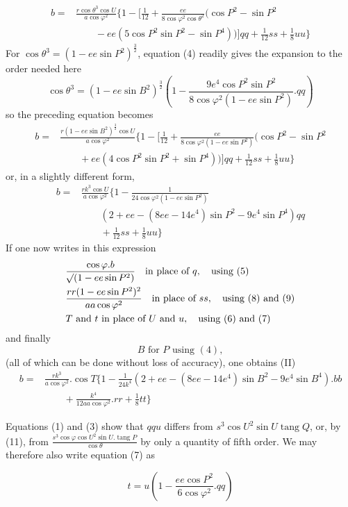 %
\[
\begin{aligned}
b={}&\frac{r\cos\theta^3\cos U}{a\cos\varphi^2}\{1-[\tfrac1{12}+\frac{ee}{8\cos\varphi^2\cos\theta^2}(\cos P^2-\sin P^2\\
&\qquad-ee(5\cos P^2\sin P^2-\sin P^4))]qq+\tfrac1{12}ss+\tfrac18uu\}
\end{aligned}
\]
For \(\cos\theta^3=(1-ee\sin P^2)^{\frac32}\), equation (4) readily gives the expansion to the order needed here
\[
\cos\theta^3=(1-ee\sin B^2)^{\frac32}(1-\frac{9e^4\cos P^2\sin P^2}{8\cos\varphi^2(1-ee\sin P^2)}\mathord{.}qq)
\]
so the preceding equation becomes
\[
\begin{aligned}
b={}&\frac{r(1-ee\sin B^2)^{\frac32}\cos U}{a\cos\varphi^2}\{1-[\tfrac1{12}+\frac{ee}{8\cos\varphi^2(1-ee\sin P^2)}(\cos P^2-\sin P^2\\
&\qquad+ee(4\cos P^2\sin P^2+\sin P^4))]qq+\tfrac1{12}ss+\tfrac18uu\}
\end{aligned}
\]
or, in a slightly different form,
\[
\begin{aligned}
b={}&\frac{rk^3\cos U}{a\cos\varphi^2}\{1-\frac{1}{24\cos\varphi^2(1-ee\sin P^2)}\\
&\qquad(2+ee-(8ee-14e^4)\sin P^2-9e^4\sin P^4)qq\\
&\qquad+\tfrac1{12}ss+\tfrac18uu\}
\end{aligned}
\]
If one now writes in this expression
\[
\begin{aligned}
&\frac{\cos\varphi\mathord{.}b}{\mathord{{}^{}\!\surd}(1-ee\sin P^2)}\quad\text{in place of }q,\quad\text{using }(5)\\
&\frac{rr(1-ee\sin P^2)^2}{aa\cos\varphi^2}\quad\text{in place of }ss,\quad\text{using }(8)\text{ and }(9)\\
&T\text{ and }t\text{ in place of }U\text{ and }u,\quad\text{using }(6)\text{ and }(7)
\end{aligned}
\]
and finally
\[
B\text{ for }P\text{ using }(4),
\]
(all of which can be done without loss of accuracy), one obtains (II)
\[
\begin{aligned}
b={}&\frac{rk^3}{a\cos\varphi^2}\mathord{.}\cos T\{1-\frac1{24k^4}(2+ee-(8ee-14e^4)\sin B^2-9e^4\sin B^4)\mathord{.}bb\\
&\qquad+\frac{k^4}{12aa\cos\varphi^2}\mathord{.}rr+\tfrac18tt\}
\end{aligned}
\]

\begingroup\raggedright
\hspace*{1.2em}Equations (1) and (3) show that \(qqu\) differs from \(s^3\cos U^2\sin U\operatorname{tang}Q\), or, by (11), from \(\frac{s^3\cos\varphi\cos U^2\sin U\mathord{.}\operatorname{tang}P}{\cos\theta}\) by only a quantity of fifth order. We may therefore also write equation (7) as\par\endgroup
\[
t=u(1-\frac{ee\cos P^2}{6\cos\varphi^2}\mathord{.}qq)
\]
